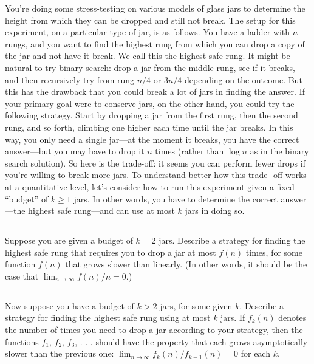 \documentclass[12pt, letterpaper]{article}
\begin{document}
You're doing some stress-testing on various models of glass jars to determine the height from which they can be dropped and still not break. 
The setup for this experiment, on a particular type of jar, is as follows. You have a ladder with $n$ rungs, and you want to find the highest rung from which you can drop a copy of the jar and not have it break. 
We call this the highest safe rung.
It might be natural to try binary search: drop a jar from the middle rung, see if it breaks, and then recursively try from rung $n/4$ or $3n/4$ depending on the outcome. But this has the drawback that you could break a lot of jars in finding the answer.
If your primary goal were to conserve jars, on the other hand, you could try the following strategy. Start by dropping a jar from the first rung, then the second rung, and so forth, climbing one higher each time until the jar breaks. In this way, you only need a single jar—at the moment it breaks, you have the correct answer—but you may have to drop it $n$ times (rather than $\log n$ as in the binary search solution).
So here is the trade-off: it seems you can perform fewer drops if you're willing to break more jars. To understand better how this trade- off works at a quantitative level, let's consider how to run this experiment given a fixed “budget” of $k \geq 1$ jars. In other words, you have to determine the correct answer—the highest safe rung—and can use at most $k$ jars in doing so.

\subsection{}
Suppose you are given a budget of $k = 2$ jars. Describe a strategy for finding the highest safe rung that requires you to drop a jar at most $f(n)$ times, for some function $f(n)$ that grows slower than linearly. (In other words, it should be the case that $\lim_{n \to \infty} f(n)/n = 0$.)

\subsection{}
Now suppose you have a budget of $k > 2$ jars, for some given $k$. Describe a strategy for finding the highest safe rung using at most $k$ jars. If $f_k(n)$ denotes the number of times you need to drop a jar according to your strategy, then the functions $f_1$, $f_2$, $f_3$, . . . should have the property that each grows asymptotically slower than the previous one: $\lim_{n \to \infty} f_{k}(n)/f_{k-1}(n) = 0$ for each $k$.
\end{document}
